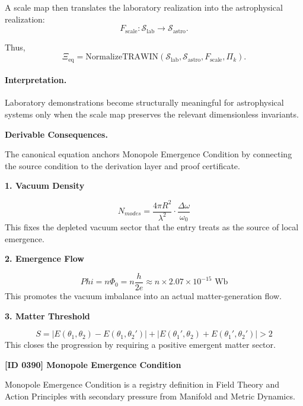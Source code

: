 A scale map then translates the laboratory realization into the astrophysical realization:
\begin{equation}
F_{\mathrm{scale}}:
\mathcal{S}_{\mathrm{lab}}
\to
\mathcal{S}_{\mathrm{astro}} .
\end{equation}

Thus,
\begin{equation}
\boxed{
\Xi_{\mathrm{eq}}
=
\mathrm{NormalizeTRAWIN}
\left(
\mathcal{S}_{\mathrm{lab}},
\mathcal{S}_{\mathrm{astro}},
F_{\mathrm{scale}},
\Pi_k
\right).
}
\end{equation}

\paragraph{Interpretation.}
Laboratory demonstrations become structurally meaningful for astrophysical systems only when the scale map preserves the relevant dimensionless invariants.

\par\vspace{0.35em}
\noindent\textbf{Derivable Consequences.}\quad
\begingroup
\footnotesize
\raggedright
The canonical equation anchors Monopole Emergence Condition by connecting the source condition to the derivation layer and proof certificate.
\par\endgroup

\noindent\textbf{1. Vacuum Density}\par
\[
N_{modes} = \frac{4\pi R^2}{\lambda^2} \cdot \frac{\Delta\omega}{\omega_0}
\]
\noindent This fixes the depleted vacuum sector that the entry treats as the source of local emergence.\par
\noindent\textbf{2. Emergence Flow}\par
\[
Phi = n\Phi_0 = n\frac{h}{2e} \approx n \times 2.07 \times 10^{-15} \text{ Wb}
\]
\noindent This promotes the vacuum imbalance into an actual matter-generation flow.\par
\noindent\textbf{3. Matter Threshold}\par
\[
S = |E(\theta_1, \theta_2) - E(\theta_1, \theta_2')| + |E(\theta_1', \theta_2) + E(\theta_1', \theta_2')| > 2
\]
\noindent This closes the progression by requiring a positive emergent matter sector.\par

\clearpage
\noindent\textbf{[ID 0390] Monopole Emergence Condition}\par
\vspace{0.35em}
\begingroup\small
{}
Monopole Emergence Condition is a registry definition in Field Theory and Action Principles with secondary pressure from Manifold and Metric Dynamics.

